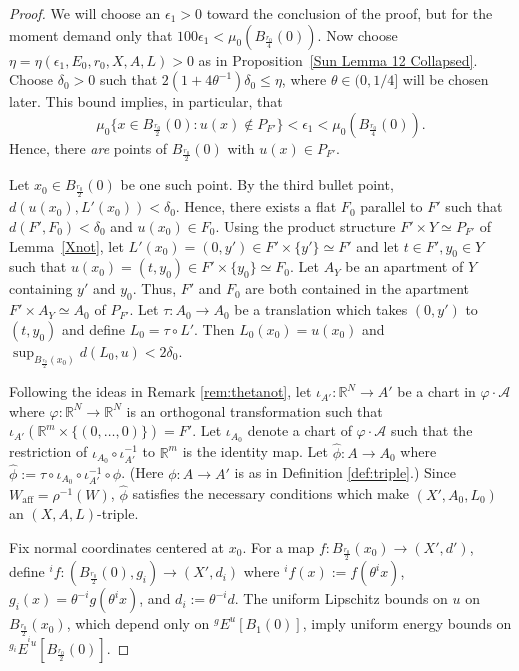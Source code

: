 \documentclass[12pt]{amsart}
\theoremstyle{definition}
\numberwithin{equation}{section}
\newcommand{\R}{\mathbb R}
\newcommand{\Waff}{W_{\mathrm{aff}}}
\begin{document}
\begin{proof}
We will choose an $\epsilon_1>0$ toward the conclusion of the proof, but for the moment demand only that $100\epsilon_1<\mu_0(B_{\frac {r_0}4}(0))$. Now choose $\eta=\eta(\epsilon_1,E_0, r_0, X, A, L)>0$ as in Proposition~\ref{Sun Lemma 12 Collapsed}. Choose $\delta_0>0$ such that $2(1+4 \theta^{-1} )\delta_0 \leq\eta$, where $\theta \in (0, 1/4]$ will be chosen later. 
This bound implies, in particular, that $$\mu_0\{x\in B_{\frac{r_0}{2}}(0):u(x)\notin P_{F'}\}< \epsilon_1<\mu_0(B_{\frac{r_0}{4}}(0)).$$  Hence, there {\em are} points of $B_{\frac {r_0}2}(0)$ with $u(x)\in P_{F'}$.

Let $x_0\in B_{\frac{r_0}{2}}(0)$ be one such point.  
By the third bullet point, $d(u(x_0),L'(x_0))<\delta_0$. Hence, there exists a flat $F_0$ parallel to $F'$ such that $d(F', F_0) < \delta_0$ and $u(x_0) \in F_0$. Using the product structure $F' \times Y\simeq P_{F'} $ of Lemma~\ref{Xnot}, let $L'(x_0) = (0,y')\in F' \times \{y'\} \simeq F'$ and let $t \in F', y_0 \in Y$ such that $u(x_0)= (t,y_0) \in F' \times \{y_0\} \simeq F_0$.  Let $A_Y$ be an apartment of $Y$ containing $y'$ and $y_0$. Thus, $F'$ and $F_0$ are both contained in the apartment $F' \times A_Y\simeq A_0$  of $P_{F'}$. Let  $\tau:A_0 \to A_0$ be a translation which takes $(0,y')$ to $(t,y_0)$ and define $L_0=\tau \circ L'$.  Then $L_0(x_0)=u(x_0)$ and $\sup_{B_{\frac{r_0}2} (x_0)}d(L_0,u)< 2\delta_0$. 


 Following the ideas in Remark \ref{rem:thetanot}, let $\iota_{A'}:\R^N \to A'$ be a chart in $\varphi \cdot \mathcal A$ where $\varphi:\R^N \to \R^N$ is an orthogonal transformation such that $\iota_{A'}(\R^m \times \{(0, \dots, 0)\}) = F'$. 
 Let $\iota_{A_0}$ denote a chart of $\varphi \cdot \mathcal A$ such that the restriction of $\iota_{A_0} \circ\iota_{A'}^{-1}$  to $\R^m$ is the identity map. Let $\hat \phi:A \to A_0$ where $\hat \phi:=\tau \circ \iota_{A_0} \circ\iota_{A'}^{-1}\circ \phi$. (Here $\phi:A \to A'$ is as in Definition \ref{def:triple}.) Since $\Waff = \rho^{-1}(W)$, $\hat \phi$ satisfies the necessary conditions which make $(X', A_0, L_0)$ an $(X,A,L)$-triple. 

Fix normal coordinates centered at $x_0$. For a map $f:B_{\frac{r_0}{2}}(x_0)\to (X',d')$, define ${^if}:(B_{\frac {r_0}{2}}(0), g_i)\to(X',d_i)$ where ${^if}(x):=f(\theta^ix)$, $g_i(x) = \theta^{-i}g(\theta^ix)$, and $d_i:=\theta^{-i}d$. The uniform Lipschitz bounds on $u$ on $B_{\frac{r_0}{2}}(x_0)$, which depend only on ${^gE}^u[B_1(0)]$, imply uniform energy bounds on ${^{g_i}E}^{{^iu}}[B_{\frac{r_0}{2}}(0)]$.



\end{proof}
\end{document}

